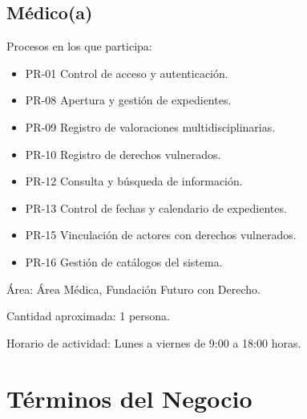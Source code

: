 \begin{Usuario}{\hypertarget{A.Medico}{\subsection{Médico(a)}}}
	\item[Procesos en los que participa:] \cdtEmpty
	\begin{itemize}
		\item PR-01 Control de acceso y autenticación.
		\item PR-08 Apertura y gestión de expedientes.
		\item PR-09 Registro de valoraciones multidisciplinarias.
		\item PR-10 Registro de derechos vulnerados.
		\item PR-12 Consulta y búsqueda de información.
		\item PR-13 Control de fechas y calendario de expedientes.
		\item PR-15 Vinculación de actores con derechos vulnerados.
		\item PR-16 Gestión de catálogos del sistema.
	\end{itemize}
	
	\item[Área:] Área Médica, Fundación Futuro con Derecho.
	\item[Cantidad aproximada:] 1 persona.
	\item[Horario de actividad:] Lunes a viernes de 9:00 a 18:00 horas.
\end{Usuario}

\section{Términos del Negocio}
\label{sec:terminosDeNegocio}


